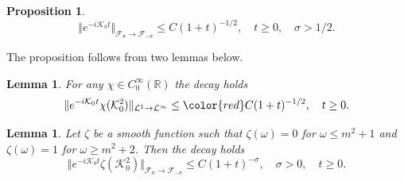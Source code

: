 \documentclass[reqno]{amsart}
\newtheorem{lemma}[theorem]{Lemma}
\newtheorem{proposition}[theorem]{Proposition}
\newcommand{\R}{{\mathbb R}}
\newcommand{\cL}{{\mathcal L}}
\newcommand{\cF}{{\mathcal F}}
\newcommand{\cK}{{\mathcal K}}
\numberwithin{equation}{section}
\begin{document}
\begin{proposition}\label{pr1} 
\begin{equation}\label{K0-decay}
\Vert  e^{-i \cK_0t} \Vert_{{\cF}_{\sigma}\to {\cF}_{-\sigma}}
\le C (1+t)^{-1/2},\quad t\ge 0,\quad \sigma>1/2.
\end{equation}
\end{proposition}
The proposition follows from two lemmas below.
\begin{lemma}\label{lem1} 
For  any $\chi\in C_0^\infty(\R)$ %
the decay holds
\begin{equation}\label{WD2}
\Vert  e^{-i \cK_0t} \chi(\cK_0^2)\Vert_{\cL^1\to \cL^\infty}
\le  {\color{red}C} (1+t)^{-1/2}, \quad t\ge 0.
\end{equation}
\end{lemma}
\begin{lemma}\label{lem2} 
Let $\zeta$  be a smooth function such that $\zeta(\omega)=0$ for $\omega\le m^2+1$ and
$\zeta(\omega)=1$ for $\omega\geq m^2 + 2$. Then the decay holds
\begin{equation}\label{WD3}
\Vert  e^{-i \cK_0t} \zeta(\cK_0^2)\Vert_{{\cF}_{\sigma}\to {\cF}_{-\sigma}}
\le C (1+t)^{-\sigma},\quad\sigma>0,\quad t\ge 0.
\end{equation}
\end{lemma}
\end{document}
